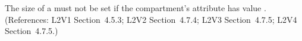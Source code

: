 The size of a \Compartment must not be set if the compartment's
 attribute has value . (References: L2V1
Section~4.5.3; L2V2 Section~4.7.4; L2V3 Section~4.7.5; L2V4 Section~4.7.5.)
